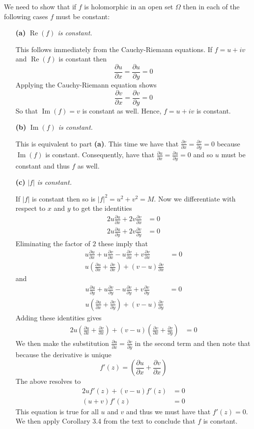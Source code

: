 \documentclass{article}
\newcommand{\exercise}[1]{\noindent{\textbf{Exercise #1:}}}
\newcommand{\der}[2]{\frac{\partial #1}{\partial #2}}
\begin{document}
\exercise{1.4.13}

We need to show that if $f$ is holomorphic in an
open set $\Omega$ then in each of the following cases $f$ must be
constant:
\begin{enumerate}
\item[\textbf{(a)}] \textit{$\operatorname{Re}(f)$ is constant.}

  This follows immediately from the Cauchy-Riemann equations. If $f =
  u +iv$ and $\operatorname{Re}(f)$ is constant then
  \[
  \der{u}{x} = \der{u}{y} = 0
  \]
  Applying the Cauchy-Riemann equation shows
  \[
  \der{v}{x} = \der{v}{y} = 0
  \]
  So that $\operatorname{Im}(f) = v$ is constant as well. Hence, $f =
  u + iv$ is constant.

\item[\textbf{(b)}] \textit{$\operatorname{Im}(f)$ is constant.}

  This is equivalent to part \textbf{(a)}. This time we have that
  $\der{v}{x} = \der{v}{y} = 0$ because $\operatorname{Im}(f)$ is
  constant. Consequently, have that $\der{u}{x} = \der{u}{y} = 0$ and
  so $u$ must be constant and thus $f$ as well.

\item[\textbf{(c)}] \textit{$|f|$ is constant.}

  If $|f|$ is constant then so is $|f|^2 = u^2+v^2 = M$. Now we
  differentiate with respect to $x$ and $y$ to get the identities
  \begin{align*}
    2u\der{u}{x} + 2v\der{v}{x} &= 0 \\
    2u\der{u}{y} + 2v\der{v}{y} &= 0
  \end{align*}
  Eliminating the factor of $2$ these imply that
  \begin{align*}
    u\der{u}{x} + u\der{v}{x} - u\der{v}{x} + v\der{v}{x} &= 0 \\
    u(\der{u}{x} + \der{v}{x}) + (v-u)\der{v}{x}
  \end{align*}
  and
  \begin{align*}
    u\der{u}{y} + u\der{v}{y} - u\der{v}{y} + v\der{v}{y} &= 0 \\
    u(\der{u}{x} + \der{v}{y}) + (v-u)\der{v}{y}
  \end{align*}
  Adding these identities gives
  \begin{align*}
    2u\left(\der{u}{x} + \der{v}{x}\right) + (v-u)\left(\der{v}{x} +
      \der{v}{y}\right) &= 0
  \end{align*}
  We then make the substitution $\der{u}{x} = \der{v}{y}$ in the
  second term and then note that because the derivative is unique
  \[
  f'(z) = \left(\der{u}{x} + \der{v}{x}\right)
  \]
  The above resolves to
  \begin{align*}
    2uf'(z) + (v-u)f'(z) &= 0 \\
    (u+v)f'(z) &= 0
  \end{align*}
  This equation is true for all $u$ and $v$ and thus we must have that
  $f'(z) = 0$. We then apply Corollary 3.4 from the text to conclude
  that $f$ is constant.
\end{enumerate}
\end{document}
